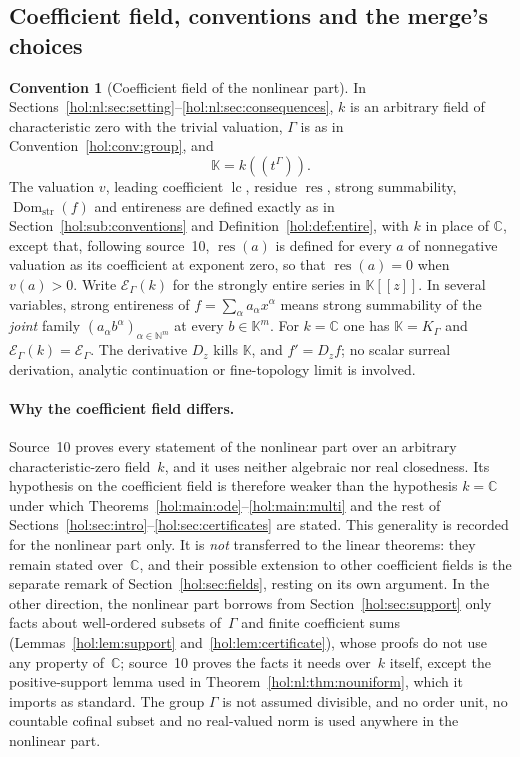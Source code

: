 \documentclass[11pt]{article}
\numberwithin{equation}{section}
\theoremstyle{definition}
\newtheorem{convention}[theorem]{Convention}
\theoremstyle{remark}
\newcommand{\C}{\mathbb C}
\newcommand{\N}{\mathbb N}
\newcommand{\K}{K_\Gamma}
\newcommand{\E}{\mathcal E_\Gamma}
\newcommand{\lc}{\operatorname{lc}}
\newcommand{\res}{\operatorname{res}}
\newcommand{\Dom}{\operatorname{Dom}_{\mathrm{str}}}
\newcommand{\KK}{\mathbb K}
\newcommand{\EK}{\mathcal E_\Gamma(k)}
\begin{document}
\subsection{Coefficient field, conventions and the merge's choices}
\label{hol:nl:sub:conventions}

\begin{convention}[Coefficient field of the nonlinear part]
\label{hol:nl:conv:field}
In Sections~\ref{hol:nl:sec:setting}--\ref{hol:nl:sec:consequences}, $k$ is an
arbitrary field of characteristic zero with the trivial valuation, $\Gamma$ is
as in Convention~\ref{hol:conv:group}, and
\[
 \KK=k((t^\Gamma)).
\]
The valuation $v$, leading coefficient $\lc$, residue $\res$, strong
summability, $\Dom(f)$ and entireness are defined exactly as in
Section~\ref{hol:sub:conventions} and Definition~\ref{hol:def:entire}, with
$k$ in place of $\C$, except that, following source~10, $\res(a)$ is defined
for every $a$ of nonnegative valuation as its coefficient at exponent zero, so
that $\res(a)=0$ when $v(a)>0$. Write $\EK$ for the strongly entire series in
$\KK[[z]]$. In several variables, strong entireness of
$f=\sum_\alpha a_\alpha x^\alpha$ means strong summability of the \emph{joint}
family $(a_\alpha b^\alpha)_{\alpha\in\N^m}$ at every $b\in\KK^m$. For $k=\C$
one has $\KK=\K$ and $\EK=\E$. The derivative $D_z$ kills $\KK$, and
$f'=D_zf$; no scalar surreal derivation, analytic continuation or
fine-topology limit is involved.
\end{convention}

\paragraph{Why the coefficient field differs.}
Source~10 proves every statement of the nonlinear part over an arbitrary
characteristic-zero field~$k$, and it uses neither algebraic nor real
closedness. Its hypothesis on the coefficient field is therefore weaker than
the hypothesis $k=\C$ under which
Theorems~\ref{hol:main:ode}--\ref{hol:main:multi} and the rest of
Sections~\ref{hol:sec:intro}--\ref{hol:sec:certificates} are stated. This
generality is recorded for the nonlinear part only. It is \emph{not}
transferred to the linear theorems: they remain stated over~$\C$, and their
possible extension to other coefficient fields is the separate remark of
Section~\ref{hol:sec:fields}, resting on its own argument. In the other
direction, the nonlinear part borrows from Section~\ref{hol:sec:support} only
facts about well-ordered subsets of~$\Gamma$ and finite coefficient sums
(Lemmas~\ref{hol:lem:support} and~\ref{hol:lem:certificate}), whose proofs do
not use any property of~$\C$; source~10 proves the facts it needs over~$k$
itself, except the positive-support lemma used in
Theorem~\ref{hol:nl:thm:nouniform}, which it imports as standard. The group $\Gamma$ is not assumed divisible, and no order unit, no
countable cofinal subset and no real-valued norm is used anywhere in the
nonlinear part.
\end{document}
